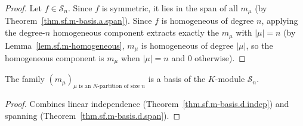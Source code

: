 \begin{proof}
\leanok
Let $f \in \mathcal{S}_n$. Since $f$ is symmetric, it lies in the span of all
$m_\mu$ (by Theorem~\ref{thm.sf.m-basis.a.span}). Since $f$ is homogeneous of degree $n$,
applying the degree-$n$ homogeneous component extracts exactly the $m_\mu$ with $|\mu| = n$
(by Lemma~\ref{lem.sf.m-homogeneous}, $m_\mu$ is homogeneous of degree $|\mu|$,
so the homogeneous component is $m_\mu$ when $|\mu| = n$ and $0$ otherwise).
\end{proof}

\begin{theorem}
\label{thm.sf.m-basis.d}
\leanhelper
\leanok
The family $(m_\mu)_{\mu \text{ is an } N\text{-partition of size } n}$ is a basis of
the $K$-module $\mathcal{S}_n$.
\end{theorem}

\begin{proof}
\leanok
Combines linear independence (Theorem~\ref{thm.sf.m-basis.d.indep})
and spanning (Theorem~\ref{thm.sf.m-basis.d.span}).
\end{proof}
